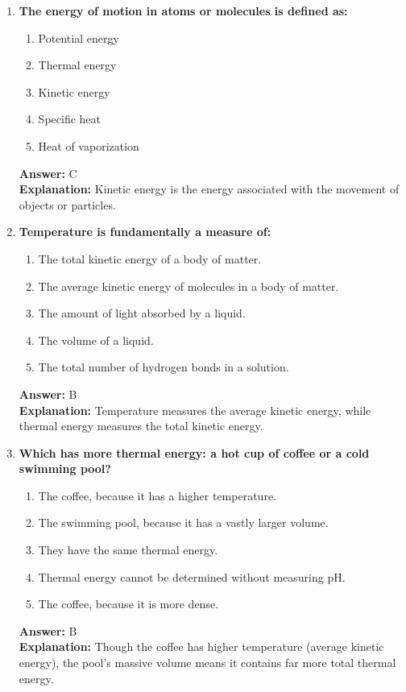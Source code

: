 \documentclass[11pt, a4paper]{article}
\begin{document}
\begin{enumerate}

\item \textbf{The energy of motion in atoms or molecules is defined as:}
\begin{enumerate}[label=\Alph*.]
    \item Potential energy
    \item Thermal energy
    \item Kinetic energy
    \item Specific heat
    \item Heat of vaporization
\end{enumerate}
\textbf{Answer:} C \\
\textbf{Explanation:} Kinetic energy is the energy associated with the movement of objects or particles.

\item \textbf{Temperature is fundamentally a measure of:}
\begin{enumerate}[label=\Alph*.]
    \item The total kinetic energy of a body of matter.
    \item The average kinetic energy of molecules in a body of matter.
    \item The amount of light absorbed by a liquid.
    \item The volume of a liquid.
    \item The total number of hydrogen bonds in a solution.
\end{enumerate}
\textbf{Answer:} B \\
\textbf{Explanation:} Temperature measures the average kinetic energy, while thermal energy measures the total kinetic energy.

\item \textbf{Which has more thermal energy: a hot cup of coffee or a cold swimming pool?}
\begin{enumerate}[label=\Alph*.]
    \item The coffee, because it has a higher temperature.
    \item The swimming pool, because it has a vastly larger volume.
    \item They have the same thermal energy.
    \item Thermal energy cannot be determined without measuring pH.
    \item The coffee, because it is more dense.
\end{enumerate}
\textbf{Answer:} B \\
\textbf{Explanation:} Though the coffee has higher temperature (average kinetic energy), the pool's massive volume means it contains far more total thermal energy.


\end{enumerate}
\end{document}
